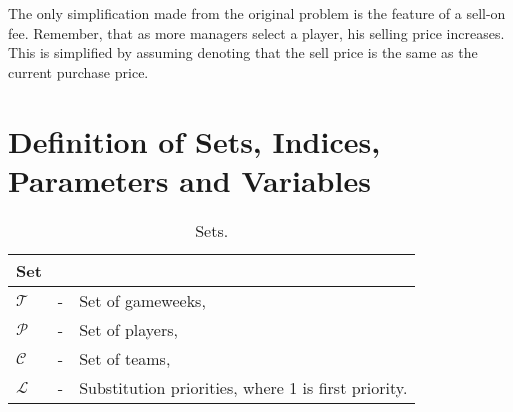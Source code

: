 \newpar

The only simplification made from the original problem is the feature of a sell-on fee. Remember, that as more managers select a player, his selling price increases. This is simplified by assuming denoting that the sell price is the same as the current purchase price. 


\begin{comment}

The only uncertainty in this problem is the number of points a player will get in each gameweek. Hence, the model is formulated accordingly. All the uncertainty lies in the objective function, and this is presented by $\rho_{pt}(\omega)$. This represents the number of points for a player $p$ in a gameweek $t$ dependent on a realization of a future event $\omega$. This event denotes all the factors deciding a player's point in a gameweek. For a goalkeeper, that includes factors such as the number of goals conceded, number of saves, penalty saved etc.

\newpar

Though the objective function is formulated in such way that it maximizes the number of expected points, once the model is solved  the objective value itself is not of interest. In the end it is the optimal team selection for a gameweek that is significant. In addition, the captain- and vice-captain choice, as well as the substitution priority are important outputs. This is reflected in the model by having small positive parameters in the objective function to ensure that these are picked accordingly. 

\end{comment}







\section{Definition of Sets, Indices, Parameters and Variables}\label{def_sets_ind_par_var}

\begin{table}[H]
\centering
\caption{Sets.}
\begin{tabular}{@{}lll@{}}
\toprule
Set           &   &                                                               \\ \midrule
$\mathcal{T}$ & - & Set of gameweeks,                                             \\
$\mathcal{P}$ & - & Set of players,                                               \\
$\mathcal{C}$ & - & Set of teams,                                                 \\
$\mathcal{L}$ & - & Substitution priorities, where 1 is first priority. \\
\bottomrule
\end{tabular}
\end{table}

